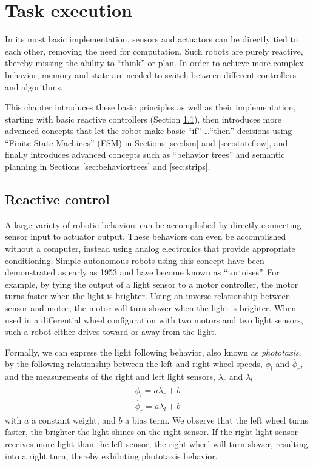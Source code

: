 \chapter{Task execution}
In its most basic implementation, sensors and actuators can be directly tied to each other, removing the need for computation. Such robots are purely reactive, thereby missing the ability to ``think'' or plan. In order to achieve more complex behavior, memory and state are needed to switch between different controllers and algorithms.

This chapter introduces these basic principles as well as their implementation, starting with basic reactive controllers (Section \ref{sec:braitenberg}), then introduces more advanced concepts that let the robot make basic ``if'' \ldots ``then'' decisions using ``Finite State Machines'' (FSM) in Sections \ref{sec:fsm} and \ref{sec:stateflow}, and finally introduces advanced concepts such as ``behavior trees'' and semantic planning in Sections \ref{sec:behaviortrees} and \ref{sec:strips}.

\section{Reactive control}\label{sec:braitenberg}
A large variety of robotic behaviors can be accomplished by directly connecting sensor input to actuator output. These behaviors can even be accomplished without a computer, instead using analog electronics that provide appropriate conditioning. Simple autonomous robots using this concept have been demonstrated as early as 1953 \cite{walter1953living} and have become known as ``tortoises''. For example, by tying the output of a light sensor to a motor controller, the motor turns faster when the light is brighter. Using an inverse relationship between sensor and motor, the motor will turn slower when the light is brighter. When used in a differential wheel configuration with two motors and two light sensors, such a robot either drives toward or away from the light. 

Formally, we can express the light following behavior, also known as \emph{phototaxis}, by the following relationship between
the left and right wheel speeds, $\dot{\phi_l}$ and $\dot{\phi_r}$, and the measurements of the right and left light sensors, $\lambda_r$ and $\lambda_l$
\begin{eqnarray}\label{eq:simplereactive}
\dot{\phi_l}=a \lambda_r + b\\
\dot{\phi_r}=a \lambda_l + b
\end{eqnarray}
with $a$ a constant weight, and $b$ a bias term. We observe that the left wheel turns faster, the brighter the light shines on the right sensor. If the right light sensor receives more light than the left sensor, the right wheel will turn slower, resulting into a right turn, thereby exhibiting phototaxis behavior.

